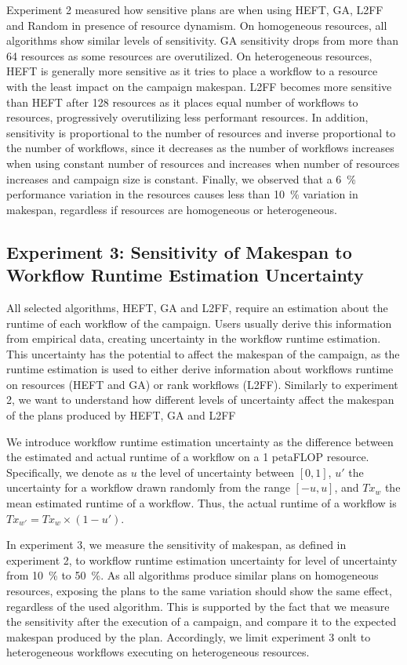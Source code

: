Experiment 2 measured how sensitive plans are when using HEFT, GA, L2FF and
Random in presence of resource dynamism. On homogeneous resources, all
algorithms show similar levels of sensitivity. GA sensitivity drops from more
than 64 resources as some resources are overutilized. On heterogeneous
resources, HEFT is generally more sensitive as it tries to place a workflow to a
resource with the least impact on the campaign makespan. L2FF becomes more
sensitive than HEFT after 128 resources as it places equal number of workflows
to resources, progressively overutilizing less performant resources. In
addition, sensitivity is proportional to the number of resources and inverse
proportional to the number of workflows, since it decreases as the number of
workflows increases when using constant number of resources and increases when
number of resources increases and campaign size is constant. Finally, we
observed that a 6~\% performance variation in the resources causes less than
10~\% variation in makespan, regardless if resources are homogeneous or
heterogeneous.

\subsection{Experiment 3: Sensitivity of Makespan to Workflow Runtime Estimation Uncertainty}

All selected algorithms, HEFT, GA and L2FF, require an estimation about the
runtime of each workflow of the campaign. Users usually derive this information
from empirical data, creating uncertainty in the workflow runtime estimation.
This uncertainty has the potential to affect the makespan of the campaign, as
the runtime estimation is used to either derive information about workflows
runtime on resources (HEFT and GA) or rank workflows (L2FF). Similarly to
experiment 2, we want to understand how different levels of uncertainty affect
the makespan of the plans produced by HEFT, GA and L2FF

We introduce workflow runtime estimation uncertainty as the difference between
the estimated and actual runtime of a workflow on a 1 petaFLOP resource.
Specifically, we denote as $u$ the level of uncertainty between $[0,1]$, $u'$
the uncertainty for a workflow drawn randomly from the range $[-u,u]$, and
$Tx_{w}$ the mean estimated runtime of a workflow. Thus, the actual runtime of
a workflow is $ Tx_{w'} = Tx_{w} \times (1-u')$.

In experiment 3, we measure the sensitivity of makespan, as defined in
experiment 2, to workflow runtime estimation uncertainty for level of
uncertainty from 10~\% to 50~\%. As all algorithms produce similar plans on
homogeneous resources, exposing the plans to the same variation should show the
same effect, regardless of the used algorithm. This is supported by the fact
that we measure the sensitivity after the execution of a campaign, and compare
it to the expected makespan produced by the plan. Accordingly, we limit
experiment 3 onlt to heterogeneous workflows executing on heterogeneous
resources.

